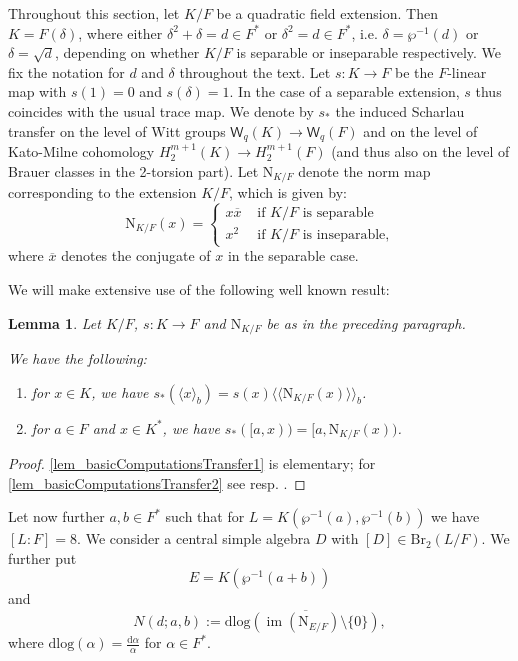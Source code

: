 \documentclass{amsart}
\newtheorem{lemma}[definition]{Lemma}
\numberwithin{equation}{section}
\newcommand{\im}{\operatorname{im}}
\newcommand{\bif}[1]{\langle #1 \rangle_b}
\newcommand{\bipf}[1]{\langle\!\langle #1\rangle\!\rangle_b}
\newcommand{\BrTwo}{\mathrm{Br}_2}
\newcommand{\quat}[1]{[#1)}
\newcommand{\norm}{\mathrm{N}}
\newcommand{\diff}{\mathrm{d}}
\newcommand{\dlog}{\mathrm{dlog}}
\newcommand{\W}{\mathsf{W}}
\begin{document}
Throughout this section, let $K / F$ be a quadratic field extension.
Then $K = F(\delta)$, where either $\delta^2 + \delta = d \in F^\ast$ or $\delta^2 = d \in F^\ast$, i.e. $\delta = \wp^{-1}(d)$ or $\delta = \sqrt d$, depending on whether $K / F$ is separable or inseparable respectively.
We fix the notation for $d$ and $\delta$ throughout the text.
Let $s: K \to F$ be the $F$-linear map with $s(1) = 0$ and $s(\delta) = 1$.
In the case of a separable extension, $s$ thus coincides with the usual trace map.
We denote by $s_\ast$ the induced Scharlau transfer on the level of Witt groups $\W_q(K) \to \W_q(F)$ and on the level of Kato-Milne cohomology $H_2^{m+1}(K) \to H_2^{m+1}(F)$ (and thus also on the level of Brauer classes in the 2-torsion part).
Let $\norm_{K/F}$ denote the norm map corresponding to the extension $K / F$, which is given by:
\[\norm_{K/F}(x) = \begin{cases}
x\overline x & \text{ if $K/F$ is separable}\\
x^2 & \text{ if $K/F$ is inseparable,}
\end{cases}\]
where $\overline x$ denotes the conjugate of $x$ in the separable case.

We will make extensive use of the following well known result:
\begin{lemma} \label{lem_basicComputationsTransfer}
	Let $K / F$, $s: K \to F$ and $\norm_{K/F}$ be as in the preceding paragraph.
	
	We have the following:
	\begin{enumerate}
		\item \label{lem_basicComputationsTransfer1} for $x\in K$, we have $s_\ast(\bif x) = s(x)\bipf{\norm_{K/F}(x)}$.
		\item \label{lem_basicComputationsTransfer2} for $a \in F$ and $x \in K^\ast$, we have $s_\ast(\quat{a, x}) = \quat{a, \norm_{K/F}(x)}$.
	\end{enumerate}
\end{lemma}
\begin{proof}
	\ref{lem_basicComputationsTransfer1} is elementary; for \ref{lem_basicComputationsTransfer2} see \cite[2.5 Lemma]{ArasonAravireBaeza_Invariants} resp. \cite[Proposition 3.2]{Bingol_SymbolLength}.
\end{proof}

Let now further $a, b \in F^\ast$ such that for $L = K(\wp^{-1}(a), \wp^{-1}(b))$ we have $[L:F] = 8$.
We consider a central simple algebra $D$ with $[D] \in \BrTwo(L/F)$.
We further put 
\[E = K(\wp^{-1}(a + b))\] and
\[N(d; a, b) := \overline{\dlog(\im(\norm_{E/F})\setminus\{0\}),}\]
where $\dlog(\alpha) = \frac{\diff \alpha}{\alpha}$ for $\alpha \in F^\ast$.
\end{document}
